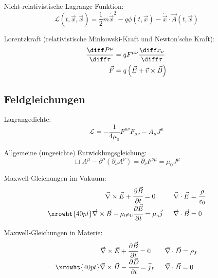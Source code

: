 \documentclass[11pt]{article}
\numberwithin{equation}{section}
\begin{document}
			\noindent
			Nicht-relativistische Lagrange Funktion:
			\begin{equation}
				\mathcal{L}(t,\vec{x},\dot{\vec{x}}) = \frac{1}{2}m\dot{\vec{x}}^2 - q\phi(t,\vec{x}) - \dot{\vec{x}}\cdot\vec{A}(t,\vec{x})
			\end{equation}

			\noindent
			Lorentzkraft (relativistische Minkowski-Kraft und Newton'sche Kraft):
			\begin{equation}
				\begin{aligned}
					\frac{\diff P^\mu}{\diff \tau} &= q F^{\mu\nu}\frac{\diff x_\nu}{\diff \tau} \\
					\vec{F} &= q\left(\vec{E}+\vec{v}\times\vec{B}\right) \\
				\end{aligned}
			\end{equation}

		\subsection{Feldgleichungen}
			\noindent
			Lagrangedichte:
			\begin{equation}
				\mathcal{L} = -\frac{1}{4\mu_0}F^{\mu\nu} F_{\mu\nu} - A_\mu J^\mu
			\end{equation}

			\noindent
			Allgemeine (ungeeichte) Entwicklungsgleichung:
			\begin{equation}
				\Box A^\mu-\partial^\mu\left(\partial_\nu A^\nu\right) = \partial_\nu F^{\nu\mu} =  \mu_0 J^\mu
			\end{equation}

			\noindent
			Maxwell-Gleichungen im Vakuum:
			\begin{equation}
			\begin{array}{rl}
				\vec{\nabla}\times \vec{E} + \cfrac{\partial\vec{B}}{\partial t} = 0 \phantom{\mu_0}
				&\;\; \vec{\nabla}\cdot\vec{E} = \cfrac{\rho}{\varepsilon_0} \\ \xrowht{40pt}
				\vec{\nabla}\times\vec{B} - \mu_0 \epsilon_0 \cfrac{\partial \vec{E}}{\partial t} = \mu_o\vec{j}
				&\;\; \vec{\nabla}\cdot\vec{B} = 0 \\
			\end{array}
			\end{equation}

			\noindent
			Maxwell-Gleichungen in Materie:
			\begin{equation}
			\begin{array}{rl}
				\vec{\nabla}\times \vec{E} + \cfrac{\partial\vec{B}}{\partial t} = 0 \phantom{_f}
				&\;\; \vec{\nabla}\cdot\vec{D} = \rho_f\\ \xrowht{40pt}
				\vec{\nabla}\times\vec{H} - \cfrac{\partial \vec{D}}{\partial t} = \vec{j}_f
				&\;\; \vec{\nabla}\cdot\vec{B} = 0 \\
			\end{array}
			\end{equation}
\end{document}
